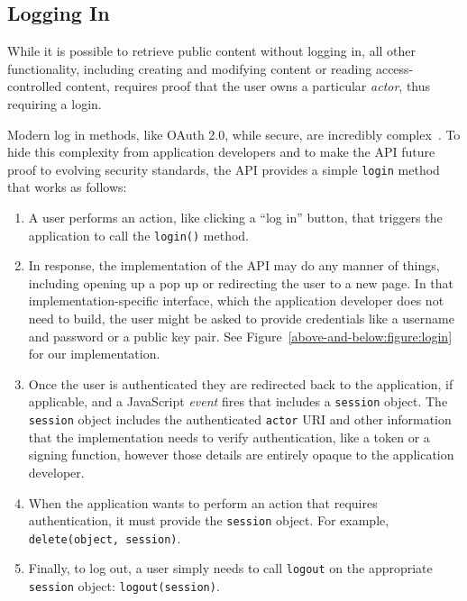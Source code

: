 
\subsection{Logging In}

While it is possible to retrieve public content without logging in,
all other functionality, including
creating and modifying content or reading access-controlled content,
requires proof that the user owns a particular \emph{actor}, thus requiring a login.

Modern log in methods, like OAuth 2.0, while secure, are incredibly complex~\cite{oauth}.
To hide this complexity from application developers and to make the API future proof
to evolving security standards, the API provides a simple \texttt{login} method that works as follows:

\begin{enumerate}
\item
A user performs an action, like clicking a ``log in'' button, that triggers
the application to call the \texttt{login()} method.
\item
In response, the implementation of the API may do any manner of things,
including opening up a pop up or redirecting the user to a new page.
In that implementation-specific interface, which the application developer
does not need to build, the user might be asked to provide credentials like a username
and password or a public key pair.
See Figure~\ref{above-and-below:figure:login} for our implementation.
\item
Once the user is authenticated they are redirected back to the application, if applicable,
and a JavaScript \emph{event} fires that includes
a \texttt{session} object. The \texttt{session} object includes the authenticated \texttt{actor}
URI and other information that the implementation needs to verify authentication, like
a token or a signing function, however those details are entirely opaque to the application developer.
\item
When the application wants to perform an action that requires authentication,
it must provide the \texttt{session} object. For example,
\texttt{delete(object, session)}.
\item
Finally, to log out, a user simply needs to call \texttt{logout} on the appropriate
\texttt{session} object: \texttt{logout(session)}.
\end{enumerate}

